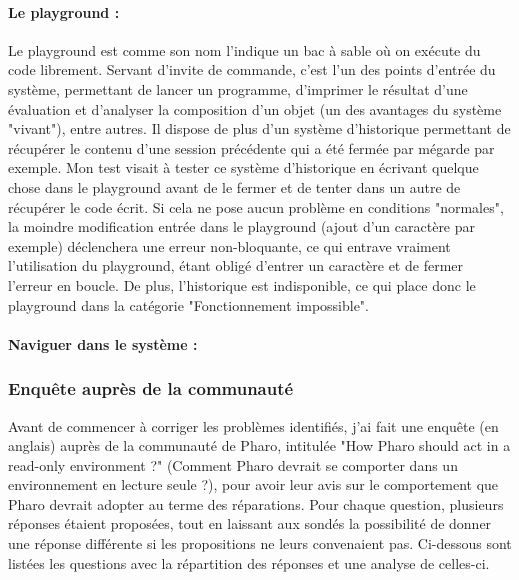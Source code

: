 \paragraph{Le playground :}
Le playground est comme son nom l'indique un bac à sable où on exécute du code librement. Servant d'invite de commande, c'est l'un des points d'entrée du système, permettant de lancer un programme, d'imprimer le résultat d'une évaluation et d'analyser la composition d'un objet (un des avantages du système "vivant"), entre autres. Il dispose de plus d'un système d'historique permettant de récupérer le contenu d'une session précédente qui a été fermée par mégarde par exemple.
Mon test visait à tester ce système d'historique en écrivant quelque chose dans le playground avant de le fermer et de tenter dans un autre de récupérer le code écrit. Si cela ne pose aucun problème en conditions "normales", la moindre modification entrée dans le playground (ajout d'un caractère par exemple) déclenchera une erreur non-bloquante, ce qui entrave vraiment l'utilisation du playground, étant obligé d'entrer un caractère et de fermer l'erreur en boucle. De plus, l'historique est indisponible, ce qui place donc le playground dans la catégorie "Fonctionnement impossible".

\paragraph{Naviguer dans le système :}


\subsubsection{Enquête auprès de la communauté}
Avant de commencer à corriger les problèmes identifiés, j'ai fait une enquête (en anglais) auprès de la communauté de Pharo, intitulée "How Pharo should act in a read-only environment ?" (Comment Pharo devrait se comporter dans un environnement en lecture seule ?), pour avoir leur avis sur le comportement que Pharo devrait adopter au terme des réparations. Pour chaque question, plusieurs réponses étaient proposées, tout en laissant aux sondés la possibilité de donner une réponse différente si les propositions ne leurs convenaient pas. Ci-dessous sont listées les questions avec la répartition des réponses et une analyse de celles-ci.

